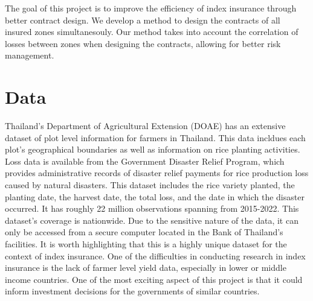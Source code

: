 \documentclass[12pt]{article}
\begin{document}
The goal of this project is to improve the efficiency of index insurance through better contract design. We develop a method to design the contracts of all insured zones simultanesouly. Our method takes into account the correlation of losses between zones when designing the contracts, allowing for better risk management.


\par


\section{Data}
Thailand's Department of Agricultural Extension (DOAE) has an extensive dataset of plot level information for farmers in Thailand. This data incldues each plot's geographical boundaries as well as information on rice planting activities. Loss data is available from the Government Disaster Relief Program, which provides administrative records of disaster relief payments for rice production loss caused by natural disasters. This dataset includes the rice variety planted, the planting date, the harvest date, the total loss, and the date in which the disaster occurred. It has roughly 22 million observations spanning from 2015-2022. This dataset's coverage is nationwide. Due to the sensitive nature of the data, it can only be accessed from a secure computer located in the Bank of Thailand's facilities. It is worth highlighting that this is a highly unique dataset for the context of index insurance. One of the difficulties in conducting research in index insurance is the lack of farmer level yield data, especially in lower or middle income countries. One of the most exciting aspect of this project is that it could inform investment decisions for the governments of similar countries.  
\end{document}
